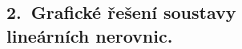 \documentclass[preview]{standalone}
\begin{document}
\begin{center}
\centering \section*{2.~Grafické řešení soustavy\\ lineárních nerovnic.}
\end{center}
\end{document}
